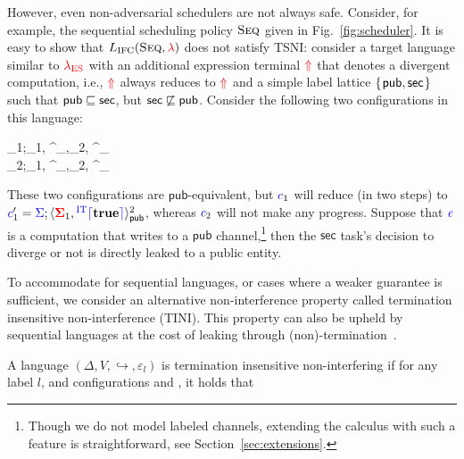 \documentclass{llncs}
\newcommand{\Varid}[1]{\mathit{#1}}
\def\resethooks{\global\let\SaveRestoreHook\empty
  \global\let\ColumnHook\empty}
\let\hspost\empty
\newcommand{\Red}[1]{{\color{red} #1}}
\begin{document}
However, even non-adversarial schedulers are not always safe.
Consider, for example, the sequential scheduling policy \ensuremath{\textsc{Seq}} given in
Fig.~\ref{fig:scheduler}.
It is easy to show that \ensuremath{L_\text{IFC}(\textsc{Seq},\Red{\lambda})} does not satisfy
TSNI:
consider a target language similar to \ensuremath{\Red{\lambda_{\text{ES}}}} with an
additional expression terminal \ensuremath{\tar{\Uparrow}} that denotes a divergent computation,
i.e., \ensuremath{\tar{\Uparrow}} always reduces to \ensuremath{\tar{\Uparrow}} and a simple label lattice \ensuremath{\{\mskip1.5mu \mathsf{pub},\mathsf{sec}\mskip1.5mu\}} such that \ensuremath{\mathsf{pub}\flows{}\mathsf{sec}}, but \ensuremath{\mathsf{sec}\not\flows{}\mathsf{pub}}.
Consider the following two configurations in this language:
\begin{hscode}\SaveRestoreHook
\column{B}{@{}>{\hspre}l<{\hspost}@{}}\column{71}{@{}>{\hspre}l<{\hspost}@{}}\column{E}{@{}>{\hspre}l<{\hspost}@{}}\>[B]{}_{1}\mathrel{=}\ifc{\Sigma};\langle \tar{\Sigma}_{1}, \;\;\;\;\tar{\Uparrow}\;\;\ifc{\rceil}\rangle^{}_{},{}\<[71]\>[71]{}\langle \tar{\Sigma}_{2}, \ifc{\Varid{e}}\rangle^{}_{}{}\<[E]\\
\>[B]{}_{2}\mathrel{=}\ifc{\Sigma};\langle \tar{\Sigma}_{1}, \;\;\;\;\tar{\Uparrow}\;\;\ifc{\rceil}\rangle^{}_{},{}\<[71]\>[71]{}\langle \tar{\Sigma}_{2}, \ifc{\Varid{e}}\rangle^{}_{}{}\<[E]\ColumnHook
\end{hscode}\resethooks
These two configurations are \ensuremath{\mathsf{pub}}-equivalent, but \ensuremath{\ifc{c}_{1}} will reduce
(in two steps)
to \ensuremath{\ifc{c}_{1}'\mathrel{=}\ifc{\Sigma};\langle \tar{\Sigma}_{1}, \ifc{^{\textrm{IT}}\lceil}\mathbf{true}\ifc{\rceil}\rangle^{\mathrm{2}}_{\mathsf{pub}}}, whereas \ensuremath{\ifc{c}_{2}} will not make
any progress.
Suppose that \ensuremath{\ifc{\Varid{e}}} is a computation that writes to a \ensuremath{\mathsf{pub}} channel,\footnote{
Though we do not model labeled channels, extending the calculus with such a
feature is straightforward, see Section~\ref{sec:extensions}.}
then the \ensuremath{\mathsf{sec}} task's decision to diverge or not is directly leaked to a
public entity.

To accommodate for sequential languages, or cases where a weaker guarantee
is sufficient, we consider an alternative non-interference property called termination insensitive
non-interference (TINI).  This property can also be upheld by sequential languages at the cost
of leaking through (non)-termination~\cite{Askarov:2008}.
\begin{definition}
  A language \ensuremath{(\Delta,V,\hookrightarrow,\varepsilon_{l})} is termination
  insensitive non-interfering if for any label \ensuremath{l}, and configurations
   and , it holds that
  
\end{definition}
\end{document}
